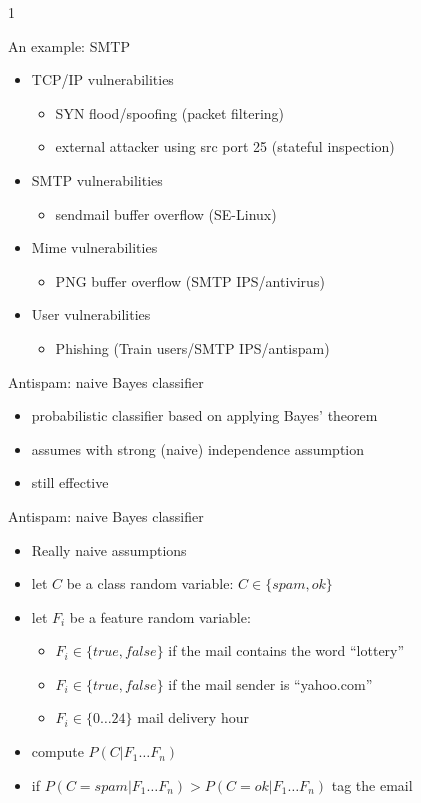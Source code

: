 1\documentclass{beamer}
\begin{document}
\begin{frame}{An example: SMTP}
  \begin{itemize}
  \item TCP/IP vulnerabilities
    \begin{itemize}
    \item SYN flood/spoofing (packet filtering)
    \item external attacker using src port 25 (stateful inspection)
    \end{itemize}
  \item SMTP vulnerabilities
    \begin{itemize}
    \item sendmail buffer overflow (SE-Linux)
    \end{itemize}
  \item Mime vulnerabilities
    \begin{itemize}
    \item PNG buffer overflow (SMTP IPS/antivirus)
    \end{itemize}
  \item User vulnerabilities
    \begin{itemize}
    \item Phishing‎ (Train users/SMTP IPS/antispam)
    \end{itemize}
  \end{itemize}
\end{frame}

\begin{frame}{Antispam: naive Bayes classifier}
  \begin{itemize}
  \item probabilistic classifier based on applying Bayes' theorem
  \item assumes with strong (naive) independence assumption
  \item still effective
  \end{itemize}
\end{frame}

\begin{frame}{Antispam: naive Bayes classifier}
  \begin{itemize}
  \item \alert{Really naive assumptions}
  \item let $C$ be a class random variable: $C \in \{spam,ok\}$
  \item let $F_i$ be a feature random variable:
    \begin{itemize}
      \item $F_i \in \{true,false\}$  if the mail contains the word
        ``lottery''
      \item $F_i \in \{true,false\}$  if the mail sender is ``yahoo.com''
      \item $F_i \in \{0 \dots 24\}$  mail delivery hour
    \end{itemize}
  \item compute $P(C|F_1 \dots F_n)$
  \item if $P(C=spam|F_1 \dots F_n) > P(C=ok|F_1 \dots F_n)$ tag the email
  \end{itemize}
\end{frame}
\end{document}
